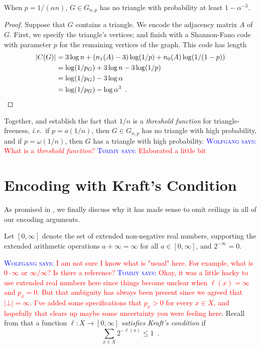 \documentclass{patmorin}
\newcommand{\aremark}[3]{\textcolor{blue}{\textsc{#1 #2:}}
  \textcolor{red}{\textsf{#3}}}
\newcommand{\tommy}[2][says]{\aremark{Tommy}{#1}{#2}}
\newcommand{\wolfgang}[2][says]{\aremark{Wolfgang}{#1}{#2}}
\begin{document}
\begin{thm}
  When $p = 1/(\alpha n)$, $G \in G_{n, p}$ has no triangle with
  probability at least $1 - \alpha^{-3}$.
\end{thm}
\begin{proof}
  Suppose that $G$ contains a triangle. We encode the adjacency matrix
  $A$ of $G$. First, we specify the triangle's vertices; and finish
  with a Shannon-Fano code with parameter $p$ for the remaining
  vertices of the graph. This code has length
  \begin{align*}
    |C(G)| &= 3 \log n + (n_1(A) - 3) \log (1/p) + n_0(A) \log (1/(1 - p)) \\
           &= \log (1/p_G) + 3 \log n - 3 \log (1/p) \\
           &= \log (1/p_G) - 3 \log \alpha \\
           &= \log (1/p_G) - \log \alpha^3 \enspace . \qedhere
  \end{align*}
\end{proof}

Together,  and  establish
the fact that $1/n$ is a \emph{threshold function} for
triangle-freeness, \emph{i.e.}~if $p = o(1/n)$, then $G \in G_{n, p}$
has no triangle with high probability, and if $p = \omega(1/n)$, then
$G$ has a triangle with high probability. \wolfgang{What is a
  \emph{threshold function}?} \tommy{Elaborated a little bit}

\section{Encoding with Kraft's Condition}

As promised in , we finally discuss why it has made
sense to omit ceilings in all of our encoding arguments.

Let $[0, \infty]$ denote the set of extended non-negative real
numbers, supporting the extended arithmetic operations
$a + \infty = \infty$ for all $a \in [0, \infty]$, and
$2^{-\infty} = 0$.

 \wolfgang{I am not sure I know what is "usual" here. For
  example, what is $0 \cdot \infty$ or $\infty/\infty$? Is there a
  reference?}  \tommy{Okay, it was a little hacky to use extended real
  numbers here since things become unclear when $\ell(x) = \infty$ and
  $p_x = 0$. But that ambiguity has always been present since we
  agreed that $|\bot| = \infty$. I've added some specifications that
  $p_x > 0$ for every $x \in X$, and hopefully that clears up maybe
  some uncertainty you were feeling here}.  Recall from 
that a function $\ell : X \to [0, \infty]$ \emph{satisfies Kraft's
  condition} if
\[
  \sum_{x \in X} 2^{-\ell(x)} \leq 1 \enspace .
\]
\end{document}

